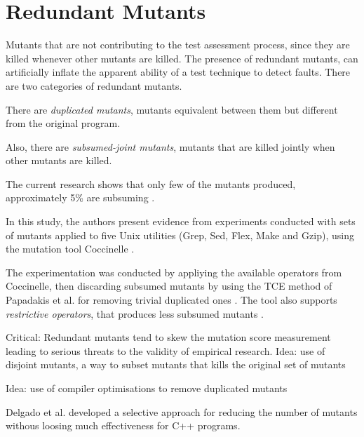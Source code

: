
\section{Redundant Mutants}\label{sec:redundant}

Mutants that are not contributing to the test assessment process, since they are killed whenever other mutants are killed. The presence of redundant mutants, can artificially inflate the apparent ability of a test technique to detect faults.
There are two categories of redundant mutants. 

There are \textit{duplicated mutants}, mutants equivalent between them but different from the original program.

Also, there are \textit{subsumed-joint mutants}, mutants that are killed jointly when other mutants are killed.

The current research shows that only few of the mutants produced, approximately 5\% are subsuming \cite{papadakis2016threats}. 

In this study, the authors present evidence from experiments conducted with sets of mutants applied to five Unix utilities (Grep, Sed, Flex, Make and Gzip), using the mutation tool Coccinelle \cite{padioleau2008documenting}. 

The experimentation was conducted by appliying the available operators from Coccinelle, then discarding subsumed mutants by using the TCE method of Papadakis et al. for removing trivial duplicated ones \cite{papadakis2015trivial}. 
The tool also supports \textit{restrictive operators}, that produces less subsumed mutants \cite{just2012redundant,kaminski2013improving}.

Critical: Redundant mutants tend to skew the mutation score measurement leading to serious threats to the validity of empirical research.
Idea: use of disjoint mutants, a way to subset mutants that kills the original set of mutants

Idea: use of compiler optimisations to remove duplicated mutants

Delgado et al. \cite{delgado2017assessment} developed a selective approach for reducing the number of mutants withous loosing much effectiveness for C++ programs.
	




